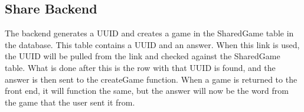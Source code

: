 \subsection{Share Backend}
The backend generates a UUID and creates a game in the SharedGame table in the database. This table contains a UUID and an answer. When this link is used, the UUID will be pulled from the link and checked against the SharedGame table. What is done after this is the row with that UUID is found, and the answer is then sent to the createGame function. When a game is returned to the front end, it will function the same, but the answer will now be the word from the game that the user sent it from.
